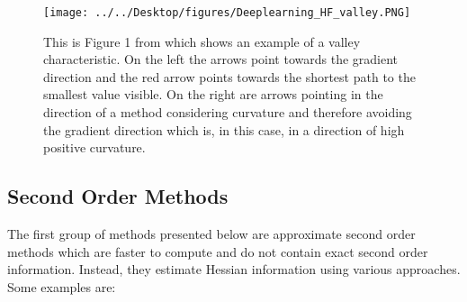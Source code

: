 \documentclass[letterpaper,12pt,titlepage,oneside,final]{book}
\begin{document}
	\begin{figure}[h]
		\centering
		\texttt{[image: ../../Desktop/figures/Deeplearning\_HF\_valley.PNG]}
		\caption{This is Figure 1 from \cite{martens2010deep} which shows an example of a valley characteristic. On the left the arrows point towards the gradient direction and the red arrow points towards the shortest path to the smallest value visible. On the right are arrows pointing in the direction of a method considering curvature and therefore avoiding the gradient direction which is, in this case, in a direction of high positive curvature.}
		\label{figure:valley}
	\end{figure}
	
	\subsection{Second Order Methods} \label{section:second_order}
	
	The first group of methods presented below are approximate second order methods which are faster to compute and do not contain exact second order information. Instead, they estimate Hessian information using various approaches. Some examples are:
	
\end{document}

